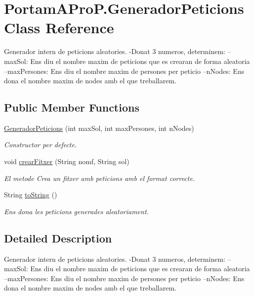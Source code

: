 \hypertarget{class_portam_a_pro_p_1_1_generador_peticions}{}\section{Portam\+A\+Pro\+P.\+Generador\+Peticions Class Reference}
\label{class_portam_a_pro_p_1_1_generador_peticions}


Generador intern de peticions aleatories. -\/\+Donat 3 numeros, determinem\+: --max\+Sol\+: Ens diu el nombre maxim de peticions que es crearan de forma aleatoria --max\+Persones\+: Ens diu el nombre maxim de persones per peticio --n\+Nodes\+: Ens dona el nombre maxim de nodes amb el que treballarem.  


\subsection*{Public Member Functions}
\begin{DoxyCompactItemize}
\item 
\hyperlink{class_portam_a_pro_p_1_1_generador_peticions_a70f24b2e595d7492753542902c5e0d85}{Generador\+Peticions} (int max\+Sol, int max\+Persones, int n\+Nodes)
\begin{DoxyCompactList}\small\item\em Constructor per defecte. \end{DoxyCompactList}\item 
void \hyperlink{class_portam_a_pro_p_1_1_generador_peticions_aea0d4f543c7be73bac2d3a9507197bd7}{crear\+Fitxer} (String nomf, String sol)
\begin{DoxyCompactList}\small\item\em El metode Crea un fitxer amb peticions amb el format correcte. \end{DoxyCompactList}\item 
String \hyperlink{class_portam_a_pro_p_1_1_generador_peticions_ad3f3aba087dac7be0bd212d86889ae7f}{to\+String} ()
\begin{DoxyCompactList}\small\item\em Ens dona les peticions generades aleatoriament. \end{DoxyCompactList}\end{DoxyCompactItemize}


\subsection{Detailed Description}
Generador intern de peticions aleatories. -\/\+Donat 3 numeros, determinem\+: --max\+Sol\+: Ens diu el nombre maxim de peticions que es crearan de forma aleatoria --max\+Persones\+: Ens diu el nombre maxim de persones per peticio --n\+Nodes\+: Ens dona el nombre maxim de nodes amb el que treballarem. 

